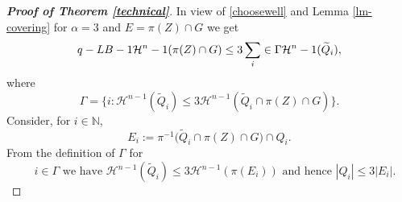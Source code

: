 \documentclass[12pt,a4paper]{amsart}
\theoremstyle{plain}
\theoremstyle{definition}
\def\eqn#1$$#2$${\begin{equation}\label#1#2\end{equation}}
\numberwithin{equation}{section}
\def\Q{\tilde{Q}}
\def\Q{\widetilde{Q}}
\def\haus{\mathcal{H}}
\newcommand{\NN}{\mathbb{N}}
\begin{document}
\begin{proof}[\textbf{Proof of Theorem \ref{technical}}]
	In view of \eqref{choosewell} and Lemma \ref{lm-covering} for $\alpha=3$ and $E=\pi(Z)\cap G$ we get
	\eqn{eq-LB-1}
	$$
	\haus^{n-1}(\pi(Z)\cap G)\leq 3\sum_{i\in \Gamma} \haus^{n-1}(\Q_i),
	$$
	where 
	$$
	\Gamma=\bigl\{i: \haus^{n-1}(\Q_i) \leq 3 \haus^{n-1}(\Q_i\cap \pi(Z)\cap G)\bigr\}.
	$$
	Consider, for $i\in \NN$,
            $$
            E_i:=\pi^{-1}\bigl(\Q_i\cap \pi\left(Z\right)\cap G\bigr)\cap Q_i.
            $$
	    From the definition of $\Gamma$ for 
      \begin{equation}\label{cstar}
      \quad i\in \Gamma\text{ we have } \haus^{n-1}(\Q_i)\leq 3 \haus^{n-1}(\pi(E_i)) \text{ and hence }|Q_i|\leq 3|E_i| .
      \end{equation} 
       
                
       

\end{proof}
\end{document}
